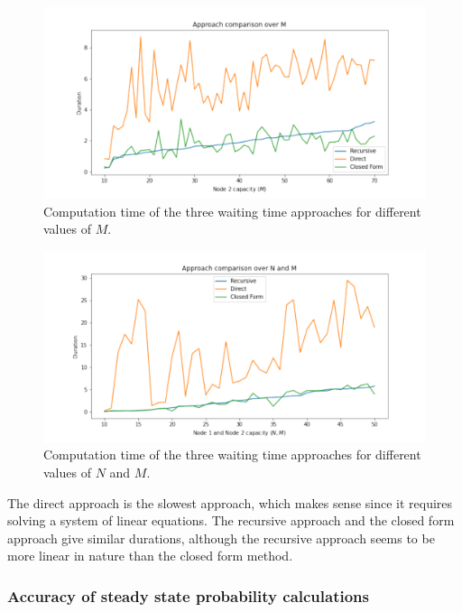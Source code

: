 \begin{figure}[H]
    \includegraphics[width=\textwidth]{chapters/03_queueing_model/img/numeric_results_and_timings/waiting_time_formulas_comparison/algorithm_duration_over_M.pdf}
    \caption{Computation time of the three waiting time approaches for different values
    of \(M\).}
    \label{fig:waiting_time_algorithm_duration_over_M}
\end{figure}


\begin{figure}[H]
    \includegraphics[width=\textwidth]{chapters/03_queueing_model/img/numeric_results_and_timings/waiting_time_formulas_comparison/algorithm_duration_over_N_and_M.pdf}
    \caption{Computation time of the three waiting time approaches for different values
    of \(N\) and \(M\).}
    \label{fig:waiting_time_algorithm_duration_over_N_and_M}
\end{figure}

The direct approach is the slowest approach, which makes sense since it requires
solving a system of linear equations.
The recursive approach and the closed form approach give similar durations,
although the recursive approach seems to be more linear in nature than the
closed form method. 


\subsubsection{Accuracy of steady state probability calculations}

